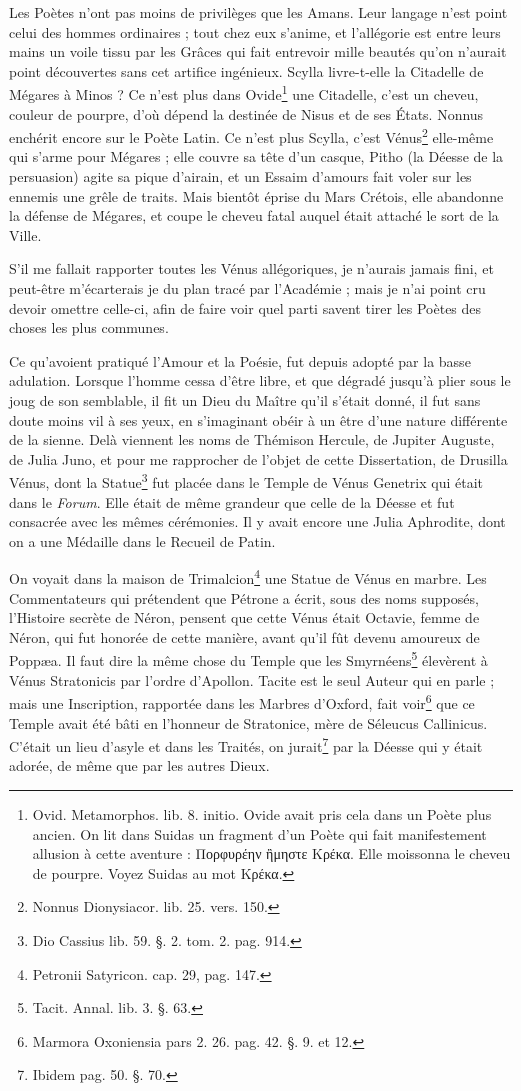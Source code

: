 \documentclass[a4paper, 18pt, oneside]{article}
\begin{document}
Les Poètes n'ont pas moins de privilèges que les Amans. Leur langage n'est point celui des hommes ordinaires ; tout chez eux s'anime, et l'allégorie est entre leurs mains un voile tissu par les Grâces qui fait entrevoir mille beautés qu'on n'aurait point découvertes sans cet artifice ingénieux. Scylla livre-t-elle la Citadelle de Mégares à Minos ? Ce n'est plus dans Ovide\footnote{Ovid. Metamorphos. lib. 8. initio. Ovide avait pris cela dans un Poète plus ancien. On lit dans Suidas un fragment d'un Poète qui fait manifestement allusion à cette aventure : Πορφυρέην ἢμηστε Κρέκα. Elle moissonna le cheveu de pourpre. Voyez Suidas au mot Κρέκα.} une Citadelle, c'est un cheveu, couleur de pourpre, d'où dépend la destinée de Nisus et de ses États. Nonnus enchérit encore sur le Poète Latin. Ce n'est plus Scylla, c'est Vénus\footnote{Nonnus Dionysiacor. lib. 25. vers. 150.} elle-même qui s'arme pour Mégares ; elle couvre sa tête d'un casque, Pitho (la Déesse de la persuasion) agite sa pique d'airain, et un Essaim d'amours fait voler sur les ennemis une grêle de traits. Mais bientôt éprise du Mars Crétois, elle abandonne la défense de Mégares, et coupe le cheveu fatal auquel était attaché le sort de la Ville.

S'il me fallait rapporter toutes les Vénus allégoriques, je n'aurais jamais fini, et peut-être m'écarterais je du plan tracé par l'Académie ; mais je n'ai point cru devoir omettre celle-ci, afin de faire voir quel parti savent tirer les Poètes des choses les plus communes.

Ce qu'avoient pratiqué l'Amour et la Poésie, fut depuis adopté par la basse adulation. Lorsque l'homme cessa d'être libre, et que dégradé jusqu'à plier sous le joug de son semblable, il fit un Dieu du Maître qu'il s'était donné, il fut sans doute moins vil à ses yeux, en s'imaginant obéir à un être d'une nature différente de la sienne. Delà viennent les noms de Thémison Hercule, de Jupiter Auguste, de Julia Juno, et pour me rapprocher de l'objet de cette Dissertation, de Drusilla Vénus, dont la Statue\footnote{Dio Cassius lib. 59. §. 2. tom. 2. pag. 914.} fut placée dans le Temple de Vénus Genetrix qui était dans le \emph{Forum}. Elle était de même grandeur que celle de la Déesse et fut consacrée avec les mêmes cérémonies. Il y avait encore une Julia Aphrodite, dont on a une Médaille dans le Recueil de Patin.

On voyait dans la maison de Trimalcion\footnote{Petronii Satyricon. cap. 29, pag. 147.} une Statue de Vénus en marbre. Les Commentateurs qui prétendent que Pétrone a écrit, sous des noms supposés, l'Histoire secrète de Néron, pensent que cette Vénus était Octavie, femme de Néron, qui fut honorée de cette manière, avant qu'il fût devenu amoureux de Poppæa. Il faut dire la même chose du Temple que les Smyrnéens\footnote{Tacit. Annal. lib. 3. §. 63.} élevèrent à Vénus Stratonicis par l'ordre d'Apollon. Tacite est le seul Auteur qui en parle ; mais une Inscription, rapportée dans les Marbres d'Oxford, fait voir\footnote{Marmora Oxoniensia pars 2. 26. pag. 42. §. 9. et 12.} que ce Temple avait été bâti en l'honneur de Stratonice, mère de Séleucus Callinicus. C'était un lieu d'asyle et dans les Traités, on jurait\footnote{Ibidem pag. 50. §. 70.} par la Déesse qui y était adorée, de même que par les autres Dieux.
\end{document}
